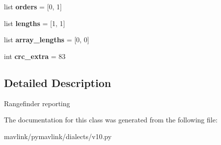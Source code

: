 \begin{DoxyCompactItemize}
\item 
\mbox{\label{classpymavlink_1_1dialects_1_1v10_1_1MAVLink__rangefinder__message_a65b2e970f8b894c0f61b51ad552dbc78}} 
list {\bfseries orders} = \mbox{[}0, 1\mbox{]}
\item 
\mbox{\label{classpymavlink_1_1dialects_1_1v10_1_1MAVLink__rangefinder__message_a9cea386c7eae3b31a8b062e7ae4dea40}} 
list {\bfseries lengths} = \mbox{[}1, 1\mbox{]}
\item 
\mbox{\label{classpymavlink_1_1dialects_1_1v10_1_1MAVLink__rangefinder__message_a0e9b7eff41972a6859f5f4acead02aff}} 
list {\bfseries array\+\_\+lengths} = \mbox{[}0, 0\mbox{]}
\item 
\mbox{\label{classpymavlink_1_1dialects_1_1v10_1_1MAVLink__rangefinder__message_aa919cf3fa42303350f5ab4d166fe5d40}} 
int {\bfseries crc\+\_\+extra} = 83
\end{DoxyCompactItemize}


\subsection{Detailed Description}
\begin{DoxyVerb}Rangefinder reporting
\end{DoxyVerb}
 

The documentation for this class was generated from the following file\+:\begin{DoxyCompactItemize}
\item 
mavlink/pymavlink/dialects/v10.\+py\end{DoxyCompactItemize}
